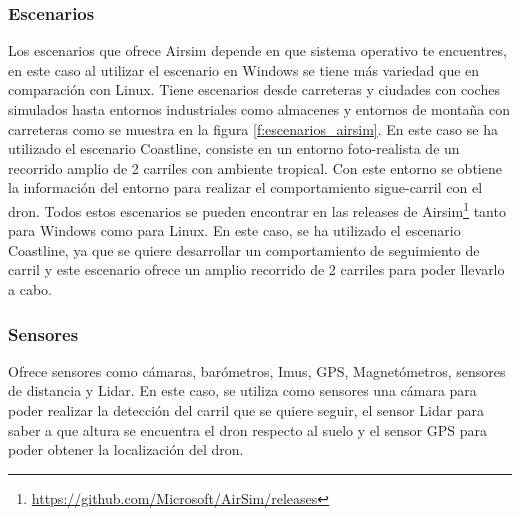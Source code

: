 \subsubsection{Escenarios}
\label{sec:airsim}
Los escenarios que ofrece Airsim depende en que sistema operativo te encuentres, en este caso al utilizar el escenario en Windows 
se tiene más variedad que en comparación con Linux. 
Tiene escenarios desde carreteras y ciudades con coches simulados hasta entornos industriales como almacenes y entornos de montaña con carreteras como se 
muestra en la figura \ref{f:escenarios_airsim}. En este caso
se ha utilizado el escenario Coastline, consiste en un entorno foto-realista de un recorrido amplio de 2 carriles con ambiente tropical. Con este entorno se obtiene la
información del entorno para realizar el comportamiento sigue-carril con el dron. 
Todos estos escenarios se pueden encontrar en las releases de Airsim\footnote{\url{https://github.com/Microsoft/AirSim/releases}} tanto para Windows como para Linux.
En este caso, se ha utilizado el escenario Coastline, ya que se quiere desarrollar un comportamiento de seguimiento de carril y este escenario ofrece un amplio recorrido de 2 carriles para poder llevarlo
a cabo.

\subsubsection{Sensores}
\label{sec:airsim}
Ofrece sensores como cámaras, barómetros, Imus, GPS, Magnetómetros, sensores de distancia y Lidar.
En este caso, se utiliza como sensores una cámara para poder realizar la detección del carril 
que se quiere seguir, el sensor Lidar para saber a que altura se encuentra el dron respecto al suelo y el sensor
GPS para poder obtener la localización del dron. 


